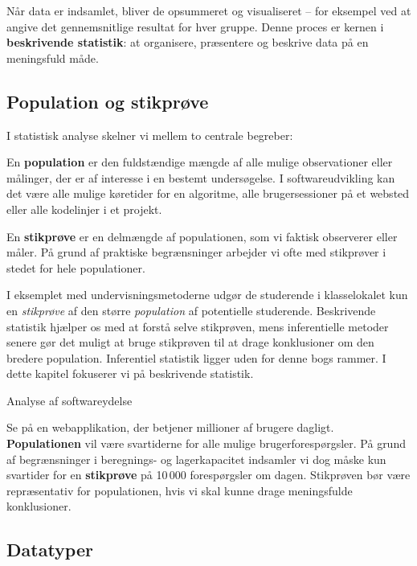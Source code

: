 Når data er indsamlet, bliver de opsummeret og visualiseret -- for eksempel ved at angive det gennemsnitlige resultat for hver gruppe. Denne proces er kernen i \textbf{beskrivende statistik}: at organisere, præsentere og beskrive data på en meningsfuld måde.  

\subsection*{Population og stikprøve}

I statistisk analyse skelner vi mellem to centrale begreber:

\begin{definition}[Population]
En \textbf{population} er den fuldstændige mængde af alle mulige observationer eller målinger, der er af interesse i en bestemt undersøgelse. I softwareudvikling kan det være alle mulige køretider for en algoritme, alle brugersessioner på et websted eller alle kodelinjer i et projekt.
\end{definition}

\begin{definition}[Stikprøve]
En \textbf{stikprøve} er en delmængde af populationen, som vi faktisk observerer eller måler. På grund af praktiske begrænsninger arbejder vi ofte med stikprøver i stedet for hele populationer.
\end{definition}

I eksemplet med undervisningsmetoderne udgør de studerende i klasselokalet kun en \emph{stikprøve} af den større \emph{population} af potentielle studerende. Beskrivende statistik hjælper os med at forstå selve stikprøven, mens inferentielle metoder senere gør det muligt at bruge stikprøven til at drage konklusioner om den bredere population. Inferentiel statistik ligger uden for denne bogs rammer. I dette kapitel fokuserer vi på beskrivende statistik.


\begin{example} Analyse af softwareydelse

Se på en webapplikation, der betjener millioner af brugere dagligt. \textbf{Populationen} vil være svartiderne for alle mulige brugerforespørgsler. På grund af begrænsninger i beregnings- og lagerkapacitet indsamler vi dog måske kun svartider for en \textbf{stikprøve} på 10\,000 forespørgsler om dagen. Stikprøven bør være repræsentativ for populationen, hvis vi skal kunne drage meningsfulde konklusioner.
\end{example}

\subsection*{Datatyper}

